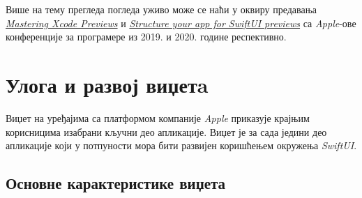 \documentclass[12pt,oneside]{memoir}
\begin{document}
\indent Више на тему прегледа погледа уживо може се наћи у оквиру предавања \href{https://developer.apple.com/videos/play/wwdc2019/233/}{\textit{Mastering Xcode Previews}} \cite{Mastering_Xcode_Previews} и \href{https://developer.apple.com/videos/play/wwdc2020/10149/}{\textit{Structure your app for SwiftUI previews}} \cite{Structure_your_app_for_SwiftUI_previews} са \textit{Apple}-ове конференције за програмере из 2019. и 2020. године респективно.

\chapter{Улога и развој виџетa}

\indent Виџет на уређајима са платформом компаније \textit{Apple} приказује крајњим корисницима изабрани кључни део апликације. Виџет је за сада једини део апликације који у потпуности мора бити развијен коришћењем окружења \textit{SwiftUI}.

\section{Основне карактеристике виџета}
\end{document}
